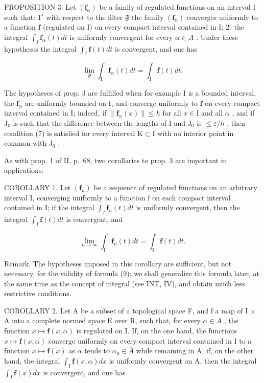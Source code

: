 PROPOSITION 3. Let \((\mathbf{f}_{\alpha})\) be a family of regulated functions on an interval I such that: \(1^{\circ}\) with respect to the filter \(\mathfrak{F}\) the family \((\mathbf{f}_{\alpha})\) converges uniformly to a function \(\mathbf{f}\) (regulated on I) on every compact interval contained in I; \(2^{\circ}\) the integral \(\int_{I} \mathbf{f}_{\alpha}(t) dt\) is uniformly convergent for every \(\alpha \in A\) . Under these hypotheses the integral \(\int_{I} \mathbf{f}(t) dt\) is convergent, and one has

\[
\lim _ {\mathfrak {F}} \int_ {\mathrm{I}} \mathbf {f} _ {\alpha} (t) d t = \int_ {\mathrm{I}} \mathbf {f} (t) d t.\tag{8}
\]

The hypotheses of prop. 3 are fulfilled when for example I is a bounded interval, the \(\mathbf{f}_{\alpha}\) are uniformly bounded on I, and converge uniformly to \(\mathbf{f}\) on every compact interval contained in I; indeed, if \(\| \mathbf{f}_{\alpha}(x)\| \leqslant h\) for all \(x\in \mathrm{I}\) and all \(\alpha\) , and if \(\mathrm{J}_0\) is such that the difference between the lengths of I and \(\mathrm{J}_0\) is \(\leqslant \varepsilon /h\) , then condition (7) is satisfied for every interval \(\mathrm{K}\subset \mathrm{I}\) with no interior point in common with \(\mathrm{J}_0\) .

As with prop. 1 of II, p.~68, two corollaries to prop. 3 are important in applications:

COROLLARY 1. Let \((\mathbf{f}_{n})\) be a sequence of regulated functions on an arbitrary interval I, converging uniformly to a function f on each compact interval contained in I; if the integral \(\int_{I} \mathbf{f}_{n}(t) dt\) is uniformly convergent, then the integral \(\int_{I} \mathbf{f}(t) dt\) is convergent, and

\[
\lim _ {n \to \infty} \int_ {\mathrm{I}} \mathbf {f} _ {n} (t) d t = \int_ {\mathrm{I}} \mathbf {f} (t) d t.\tag{9}
\]

Remark. The hypotheses imposed in this corollary are sufficient, but not necessary, for the validity of formula (9); we shall generalize this formula later, at the same time as the concept of integral (see INT, IV), and obtain much less restrictive conditions.

COROLLARY 2. Let A be a subset of a topological space F, and f a map of I × A into a complete normed space E over R, such that, for every \(\alpha \in A\) , the function \(x \mapsto \mathbf{f}(x, \alpha)\) is regulated on I. If, on the one hand, the functions \(x \mapsto \mathbf{f}(x, \alpha)\) converge uniformly on every compact interval contained in I to a function \(x \mapsto \mathbf{f}(x)\) as \(\alpha\) tends to \(\alpha_{0} \in \overline{A}\) while remaining in A; if, on the other hand, the integral \(\int_{I} \mathbf{f}(x, \alpha) dx\) is uniformly convergent on A, then the integral \(\int_{I} \mathbf{f}(x) dx\) is convergent, and one has

